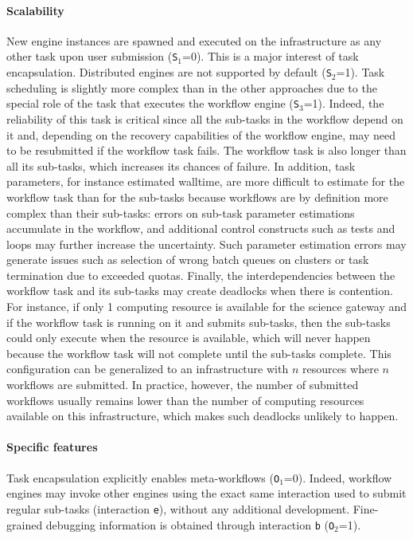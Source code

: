 \documentclass[preprint,3p,twocolumn]{elsarticle}
\begin{document}
\paragraph{Scalability}
New engine instances are spawned and executed on the infrastructure as
any other task upon user submission (\texttt{S$_1$}=0). This is a
major interest of task encapsulation. Distributed engines are not
supported by default (\texttt{S$_2$}=1). Task scheduling is slightly
more complex than in the other approaches due to the special role of
the task that executes the workflow engine (\texttt{S$_3$}=1). 
Indeed,
the reliability of this task is critical since all the sub-tasks in
the workflow depend on it and, depending on the recovery capabilities
of the workflow engine, may need to be resubmitted if the workflow
task fails. The workflow task is also longer than all its sub-tasks,
which increases its chances of failure. In addition, task parameters,
for instance estimated walltime, are more difficult to estimate for
the workflow task than for the sub-tasks because workflows are by
definition more complex than their sub-tasks: errors on sub-task
parameter estimations accumulate in the workflow, and additional
control constructs such as tests and loops may further increase the
uncertainty. Such parameter estimation errors may generate issues such
as selection of wrong batch queues on clusters or task termination due
to exceeded quotas. Finally, the interdependencies between
the workflow task and its sub-tasks may create deadlocks when there is
contention. For instance, if only 1 computing resource is available
for the science gateway and if the workflow task is running on it and
submits sub-tasks, then the sub-tasks could only execute when the
resource is available, which will never happen because the workflow
task will not complete until the sub-tasks complete. This
configuration can be generalized to an infrastructure with $n$
resources where $n$ workflows are submitted. In practice, however, the
number of submitted workflows usually remains lower than the number of
computing resources available on this infrastructure, which makes such
deadlocks unlikely to happen. 

\paragraph{Specific features} Task encapsulation explicitly enables
meta-workflows (\texttt{O$_1$}=0). Indeed, workflow engines may invoke
other engines using the exact same interaction used to submit regular
sub-tasks (interaction \texttt{e}), without any additional
development. Fine-grained debugging
information is obtained through interaction \texttt{b}
(\texttt{O$_2$}=1). 
\end{document}
